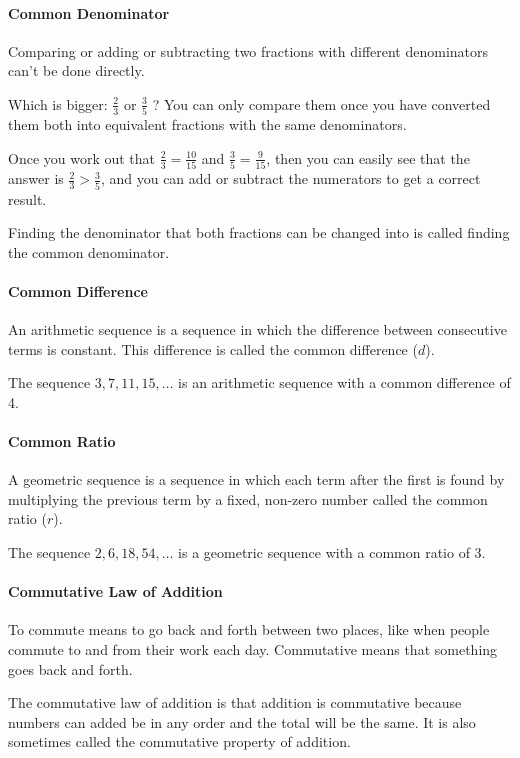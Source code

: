 \documentclass[12pt]{article}
\begin{document}
\paragraph{Common Denominator}
Comparing or adding or subtracting two fractions with different denominators can't be done directly.

Which is bigger: $\frac{2}{3}$ or $\frac{3}{5}$ ? You can only compare them once you have converted them both into equivalent fractions with the same denominators.

Once you work out that $\frac{2}{3} = \frac{10}{15}$ and $\frac{3}{5} = \frac{9}{15}$, then you can easily see that the answer is $\frac{2}{3}>\frac{3}{5}$, and you can add or subtract the numerators to get a correct result.

Finding the denominator that both fractions can be changed into is called finding the common denominator.

\paragraph{Common Difference}
An arithmetic sequence is a sequence in which the difference between consecutive terms is constant. This difference is called the common difference (\(d\)).

The sequence \(3, 7, 11, 15, \ldots\) is an arithmetic sequence with a common difference of 4.

\paragraph{Common Ratio}
A geometric sequence is a sequence in which each term after the first is found by multiplying the previous term by a fixed, non-zero number called the common ratio (\(r\)).

The sequence \(2, 6, 18, 54, \ldots\) is a geometric sequence with a common ratio of 3.

\paragraph{Commutative Law of Addition}
To commute means to go back and forth between two places, like when people commute to and from their work each day. Commutative means that something goes back and forth.

The commutative law of addition is that addition is commutative because numbers can added be in any order and the total will be the same. It is also sometimes called the commutative property of addition.
\end{document}
